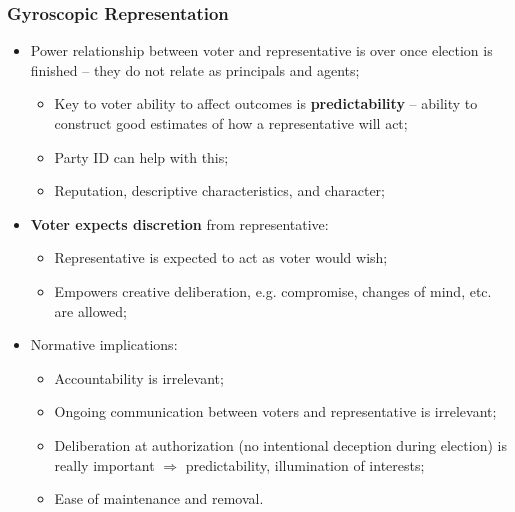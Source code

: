 \documentclass[aspectratio=169]{beamer}
\theoremstyle{principle}
\begin{document}
\begin{frame}
\frametitle{Gyroscopic Representation}
\begin{itemize}
\item Power relationship between voter and representative is over once election is finished -- they do not relate as principals and agents;
\begin{itemize} 
\item Key to voter ability to affect outcomes is \textbf{predictability} -- ability to construct good estimates of how a representative will act;
\item Party ID can help with this;
\item Reputation, descriptive characteristics, and character;
\end{itemize}
\bigskip
\bigskip
\item \textbf{Voter expects discretion} from representative:
\begin{itemize}
\item Representative is expected to act as voter would wish;
\item Empowers creative deliberation, e.g. compromise, changes of mind, etc. are allowed;
\end{itemize}
\bigskip
\bigskip
\item Normative implications:
\begin{itemize}
\item Accountability is irrelevant;
\item Ongoing communication between voters and representative is irrelevant;
\item Deliberation at authorization (no intentional deception during election) is really important $\Rightarrow$ predictability, illumination of interests;
\item Ease of maintenance and removal.
\end{itemize}
\end{itemize}

\end{frame}
\end{document}
